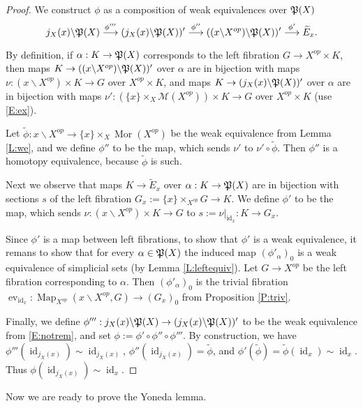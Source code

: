 \documentclass[12pt]{amsart}
\theoremstyle{plain}
\theoremstyle{definition}
\numberwithin{equation}{section}
\newcommand{\cal}[1]{\mathcal{#1}}
\newcommand{\C}[1]{\cal#1}
\newcommand{\lra}{\longrightarrow}
\newcommand{\wt}{\widetilde}
\newcommand{\bs}{\backslash}
\newcommand{\al}{\alpha}
\newcommand{\rl}[1]{Lemma \ref{L:#1}}
\newcommand{\rp}[1]{Proposition \ref{P:#1}}
\newcommand{\re}[1]{\ref{E:#1}}
\newcommand{\Map}{\operatorname{Map}}
\newcommand{\id}{\operatorname{id}}
\newcommand{\ev}{\operatorname{ev}}
\newcommand{\Mor}{\operatorname{Mor}}
\renewcommand{\P}{\frak{P}}
\begin{document}
\begin{proof}
We construct $\phi$ as a composition of weak equivalences over
$\P(X)$
\[
j_X(x)\bs\P(X)\overset{\phi'''}{\lra}(j_X(x)\bs\P(X))'
\overset{\phi''}{\lra}((x\bs X^{op})\bs
\P(X))'\overset{\phi'}{\lra}\wt{E}_x.
\]

By definition, if $\al:K\to\P(X)$ corresponds to the left
fibration $G\to X^{op}\times K$, then maps $K\to((x\bs X^{op})\bs
\P(X))'$ over $\al$ are in bijection with maps $\nu:(x\bs
X^{op})\times K\to G$ over $X^{op}\times K$, and maps
$K\to(j_X(x)\bs \P(X))'$ over $\al$ are in bijection with maps
$\nu':(\{x\}\times_X\C{M}(X^{op}))\times K\to G$ over $X^{op}\times
K$ (use \re{ex}).

Let $\wt{\phi}:x\bs X^{op}\to \{x\}\times_X\Mor(X^{op})$ be the
weak equivalence from \rl{we}, and we define $\phi''$ to be the
map, which sends $\nu'$ to $\nu'\circ\wt{\phi}$. Then $\phi''$ is
a homotopy equivalence, because $\wt{\phi}$ is such.

Next we observe that maps $K\to\wt{E}_x$ over $\al:K\to\P(X)$ are in
bijection with sections $s$ of the left fibration
$G_x:=\{x\}\times_{X^{op}}G\to K$. We define $\phi'$ to be the
map, which sends $\nu:(x\bs X^{op})\times K\to G$ to
$s:=\nu|_{\id_x}:K\to G_x$.

Since $\phi'$ is a map between left fibrations, to show that
$\phi'$ is a weak equivalence, it remans to show that for every
$\al\in\P(X)$ the induced map $(\phi'_{\al})_0$ is a weak
equivalence of simplicial sets (by \rl{leftequiv}). Let $G\to
X^{op}$ be the left fibration corresponding to $\al$. Then
$(\phi'_{\al})_0$ is the trivial fibration $\ev_{\id_x}:\Map_{X^{op}}(x\bs
X^{op},G)\to (G_x)_0$ from \rp{triv}.

Finally, we define $\phi''':j_X(x)\bs\P(X)\to(j_X(x)\bs\P(X))'$ to
be the weak equivalence from \re{notrem}, and set
$\phi:=\phi'\circ\phi''\circ\phi'''$. By construction, we have
$\phi'''(\id_{j_X(x)})\sim\id_{j_X(x)}$,
$\phi''(\id_{j_X(x)})=\wt{\phi}$, and
$\phi'(\wt{\phi})=\wt{\phi}(\id_x)\sim\id_x$. Thus
$\phi(\id_{j_X(x)})\sim\id_x$.
\end{proof}

Now we are ready to prove the Yoneda lemma.
\end{document}
